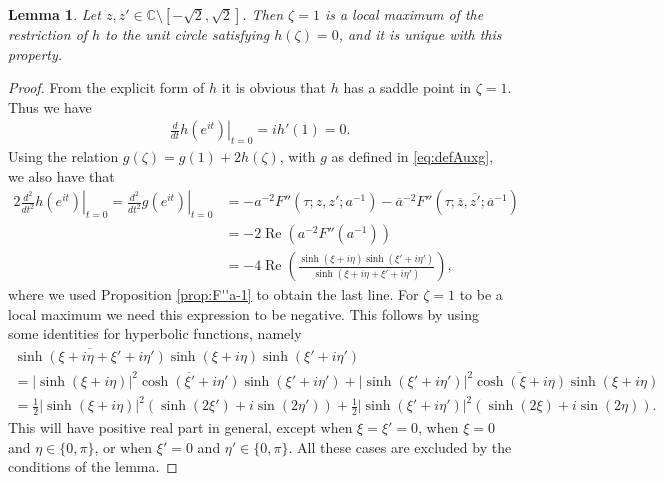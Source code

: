 \documentclass[%
 jmp,
cp,  %
 amsmath,amsthm,amssymb,%
 reprint,%
onecolumn]{revtex4-2}
\newtheorem{lemma}[theorem]{Lemma}
\begin{document}
\begin{lemma} \label{prop:localmax1}
Let $z,z'\in \mathbb C\setminus [-\sqrt 2, \sqrt 2]$. Then $\zeta=1$ is a local maximum of the restriction of $h$ to the unit circle satisfying $h(\zeta)=0$, and it is unique with this property. 
\end{lemma}

\begin{proof}
From the explicit form of $h$ it is obvious that $h$ has a saddle point in $\zeta=1$. Thus we have 
\begin{align*}
\left. \frac{d}{dt} h\left(e^{i t}\right)\right|_{t=0} = i h'(1) = 0.
\end{align*}
Using the relation $g(\zeta)=g(1)+2 h(\zeta)$, with $g$ as defined in \eqref{eq:defAuxg}, we also have that
\begin{align*}
\left. 2\frac{d^2}{dt^2} h(e^{it})\right|_{t=0} = \left. \frac{d^2}{dt^2} g(e^{it})\right|_{t=0} &= - a^{-2} F''(\tau;z,z'; a^{-1}) - \overline a^{-2} F''(\tau;\overline z,\overline{z'}; \overline a^{-1})\\
&= -2 \operatorname{Re}\left(a^{-2} F''(a^{-1})\right)\\
&= -4 \operatorname{Re}\left(\frac{\sinh(\xi+i\eta) \sinh(\xi'+i\eta')}{\sinh(\xi+i\eta+\xi'+i\eta')}\right),
\end{align*}
where we used Proposition \ref{prop:F''a-1} to obtain the last line. For $\zeta=1$ to be a local maximum we need this expression to be negative.  This follows by using some identities for hyperbolic functions, namely
\begin{multline*}
\overline{\sinh(\xi+i\eta+\xi'+i\eta')} \sinh(\xi+i\eta) \sinh(\xi'+i\eta')\\
= |\sinh(\xi+i\eta)|^2 \overline{\cosh(\xi'+i\eta')} \sinh(\xi'+i\eta')
+ |\sinh(\xi'+i\eta')|^2 \overline{\cosh(\xi+i\eta)} \sinh(\xi+i\eta)\\
= \frac{1}{2} |\sinh(\xi+i\eta)|^2 \left(\sinh(2\xi') + i \sin(2\eta')\right)
+ \frac{1}{2} |\sinh(\xi'+i\eta')|^2 \left(\sinh(2\xi) + i \sin(2\eta)\right).
\end{multline*}
This will have positive real part in general, except when $\xi=\xi'=0$, when $\xi=0$ and $\eta\in \{0,\pi\}$, or when $\xi'=0$ and $\eta'\in \{0,\pi\}$. All these cases are excluded by the conditions of the lemma. 


\end{proof}
\end{document}
